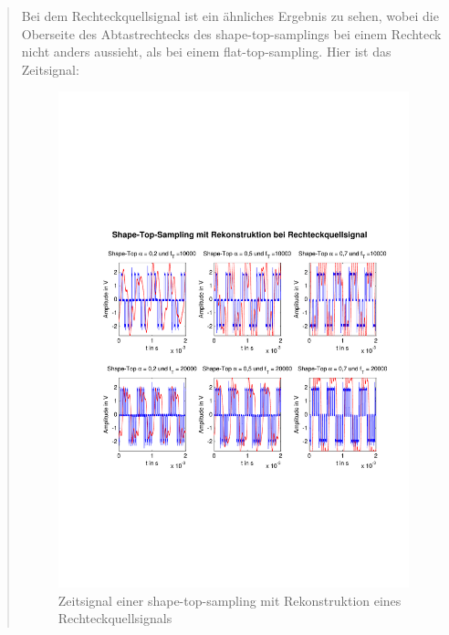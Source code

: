 \begin{quote}
    
    	Bei dem Rechteckquellsignal ist ein ähnliches Ergebnis zu sehen, wobei die
    	Oberseite des Abtastrechtecks des shape-top-samplings bei einem Rechteck
    	nicht anders aussieht, als bei einem flat-top-sampling. Hier ist das
    	Zeitsignal:
    	   	
    	\begin{figure}[H]
    \centering
        \includegraphics[scale=0.7, trim = 0cm 0cm 0cm 0cm,
        clip]{./Bilder/shape-top-recht}
            \caption{Zeitsignal einer shape-top-sampling mit Rekonstruktion
            eines Rechteckquellsignals}
  	    \end{figure}
  	    

\end{quote}
